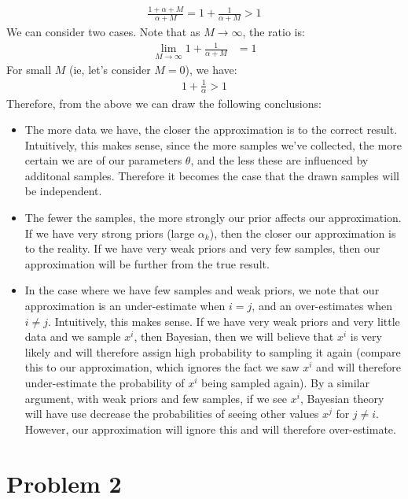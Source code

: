 \documentclass[12pt]{article}
\begin{document}
\begin{enumerate}[label=(\alph*)]
  \begin{align*}
  	\frac{1 + \alpha + M}{\alpha + M} = 1 + \frac{1}{\alpha + M} > 1
  \end{align*}
  We can consider two cases. Note that as $M \to \infty$, the ratio is:
  \begin{align*}
  	\lim_{M \to \infty} 1 + \frac{1}{\alpha + M} &= 1
  \end{align*}
  For small $M$ (ie, let's consider $M = 0$), we have:
  \begin{align*}
  1 + \frac{1}{\alpha} > 1
  \end{align*}
  Therefore, from the above we can draw the following conclusions:
  \begin{itemize}
  	\item The more data we have, the closer the approximation is to the correct result. Intuitively, this makes sense, since the more samples we've collected, the more certain we are of our parameters $\theta$, and the less these are influenced by additonal samples. Therefore it becomes the case that the drawn samples will be independent.
  	\item The fewer the samples, the more strongly our prior affects our approximation. If we have very strong priors (large $\alpha_k$), then the closer our approximation is to the reality. If we have very weak priors and very few samples, then our approximation will be further from the true result.
  	\item In the case where we have few samples and weak priors, we note that our approximation is an under-estimate when $i = j$, and an over-estimates when $i \neq j$. Intuitively, this makes sense. If we have very weak priors and very little data and we sample $x^i$, then Bayesian, then we will believe that $x^i$ is very likely and will therefore assign high probability to sampling it again (compare this to our approximation, which ignores the fact we saw $x^i$ and will therefore under-estimate the probability of $x^i$ being sampled again). By a similar argument, with weak priors and few samples, if we see $x^i$, Bayesian theory will have use decrease the probabilities of seeing other values $x^j$ for $j \neq i$. However, our approximation will ignore this and will therefore over-estimate.
  \end{itemize}

\end{enumerate}

\section*{Problem 2}
\end{document}
